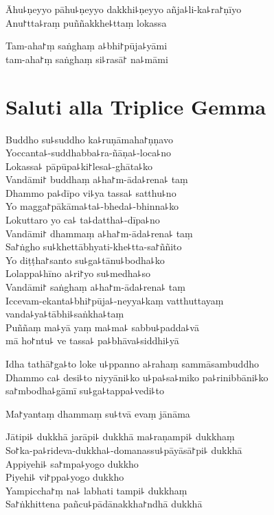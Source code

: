 Āhu꜕ṇeyyo pāhu꜕ṇeyyo dakkhi꜕ṇeyyo añja꜕li-ka꜕ra꜓ṇīyo\\
Anu꜓tta꜕raṃ puññakkhe꜕ttaṃ lokassa

Tam-aha꜓ṃ saṅghaṃ a꜕bhi꜓pūja꜕yāmi\\
\vin tam-aha꜓ṃ saṅghaṃ si꜕rasā꜓ na꜕māmi 

\chapter{Saluti alla Triplice Gemma}%

\begin{leader}
\end{leader}

Buddho su꜕suddho ka꜕ruṇāmaha꜓ṇṇavo\\
Yoccanta꜕-suddhabba꜕ra-ñāṇa꜕-loca꜕no\\
Lokassa꜕ pāpūpa꜕ki꜓lesa꜕-ghāta꜕ko\\
Vandāmi꜓ buddhaṃ a꜕ha꜓m-āda꜕rena꜕ taṃ\\
Dhammo pa꜕dīpo vi꜕ya tassa꜕ satthu꜕no\\
Yo magga꜓pākāma꜕ta꜕-bheda꜕-bhinna꜕ko\\
Lokuttaro yo ca꜕ ta꜕dattha꜕-dīpa꜕no\\
Vandāmi꜓ dhammaṃ a꜕ha꜓m-āda꜕rena꜕ taṃ\\
Sa꜓ṅgho su꜕khettābhyati-khe꜕tta-sa꜓ññito\\
Yo diṭṭha꜓santo su꜕ga꜕tānu꜕bodha꜕ko\\
Lolappa꜕hīno a꜕ri꜓yo su꜕medha꜕so\\
Vandāmi꜓ saṅghaṃ a꜕ha꜓m-āda꜕rena꜕ taṃ\\
Iccevam-ekanta꜕bhi꜓pūja꜕-neyya꜕kaṃ vatthuttayaṃ\\
vanda꜕ya꜕tābhi꜕saṅkha꜕taṃ\\
Puññaṃ ma꜕yā yaṃ ma꜕ma꜕ sabbu꜕padda꜕vā\\
\vin mā ho꜓ntu꜕ ve tassa꜕ pa꜕bhāva꜕siddhi꜕yā

Idha tathā꜓ga꜕to loke u꜕ppanno a꜕rahaṃ sammāsambuddho\\
Dhammo ca꜕ desi꜕to niyyāni꜕ko u꜕pa꜕sa꜕miko pa꜕rinibbāni꜕ko\\
\vin sa꜓mbodha꜕gāmī su꜕ga꜕tappa꜕vedi꜕to

Ma꜓yantaṃ dhammaṃ su꜕tvā evaṃ jānāma

Jātipi꜕ dukkhā jarāpi꜕ dukkhā ma꜕raṇampi꜕ dukkhaṃ\\
So꜓ka-pa꜕rideva-dukkha꜕-domanassu꜕pāyāsā꜓pi꜕ dukkhā\\
Appiyehi꜕ sa꜓mpa꜕yogo dukkho\\
Piyehi꜕ vi꜓ppa꜕yogo dukkho\\
Yampiccha꜓ṃ na꜕ labhati tampi꜕ dukkhaṃ\\
Sa꜓ṅkhittena pañcu꜕pādānakkha꜓ndhā dukkhā

